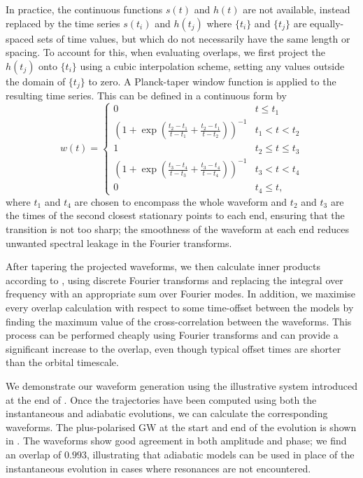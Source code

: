 In practice, the continuous functions $s(t)$ and $h(t)$ are not available, instead replaced by the time series $s(t_i)$ and $h(t_j)$ where $\{t_i\}$ and $\{t_j\}$ are equally-spaced sets of time values, but which do not necessarily have the same length or spacing. To account for this, when evaluating overlaps, we first project the $h(t_j)$ onto $\{t_i\}$ using a cubic interpolation scheme, setting any values outside the domain of $\{t_j\}$ to zero. A Planck-taper window function \citep{mckechan_tapering_2010} is applied to the resulting time series. This can be defined in a continuous form by
\begin{equation}
w(t) = \left\{
\begin{array}{ll}
	0 & t\leq t_1 \\
	\left(1+\exp\left(\frac{t_2-t_1}{t-t_1}+\frac{t_2-t_1}{t-t_2}\right)\right)^{-1} & t_1 < t < t_2 \\
	1 & t_2\leq t\leq t_3 \\
	\left(1+\exp\left(\frac{t_3-t_4}{t-t_3}+\frac{t_3-t_4}{t-t_4}\right)\right)^{-1} & t_3 < t < t_4 \\
	0 & t_4\leq t,
\end{array}\right.
\end{equation}
where $t_1$ and $t_4$ are chosen to encompass the whole waveform and $t_2$ and $t_3$ are the times of the second closest stationary points to each end, ensuring that the transition is not too sharp; the smoothness of the waveform at each end reduces unwanted spectral leakage in the Fourier transforms.

After tapering the projected waveforms, we then calculate inner products according to , using discrete Fourier transforms and replacing the integral over frequency with an appropriate sum over Fourier modes. In addition, we maximise every overlap calculation with respect to some time-offset between the models by finding the maximum value of the cross-correlation between the waveforms. This process can be performed cheaply using Fourier transforms and can provide a significant increase to the overlap, even though typical offset times are shorter than the orbital timescale.

We demonstrate our waveform generation using the illustrative system introduced at the end of . Once the trajectories have been computed using both the instantaneous and adiabatic evolutions, we can calculate the corresponding waveforms. The plus-polarised GW at the start and end of the evolution is shown in . The waveforms show good agreement in both amplitude and phase; we find an overlap of $0.993$, illustrating that adiabatic models can be used in place of the instantaneous evolution in cases where resonances are not encountered.

